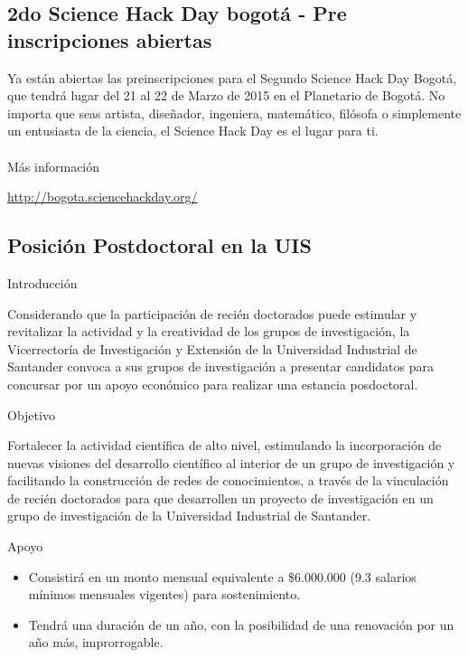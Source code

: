 \documentclass{book}
\begin{document}
\subsection{2do Science Hack Day bogotá - Pre inscripciones abiertas}

Ya están abiertas las preinscripciones para el Segundo Science Hack Day Bogotá, que tendrá lugar del 21 al 22 de Marzo de 2015 en el Planetario de Bogotá. No importa que seas artista, diseñador, ingeniera, matemático, filósofa o simplemente un entusiasta de la ciencia, el Science Hack Day es el lugar para ti.\\
\\
Más información
\begin{center}
\url{http://bogota.sciencehackday.org/}
\end{center}


\subsection{Posición Postdoctoral en la UIS}

\begin{description}
\item[Introducción]
\end{description}

Considerando que la participación de recién doctorados puede estimular y revitalizar la
actividad y la creatividad de los grupos de investigación, la Vicerrectoría de Investigación y
Extensión de la Universidad Industrial de Santander convoca a sus grupos de investigación
a presentar candidatos para concursar por un apoyo económico para realizar una estancia
posdoctoral.
\begin{description}
\item[Objetivo]
\end{description}
Fortalecer la actividad científica de alto nivel, estimulando la incorporación de nuevas visiones
del desarrollo científico al interior de un grupo de investigación y facilitando la construcción
de redes de conocimientos, a través de la vinculación de recién doctorados para
que desarrollen un proyecto de investigación en un grupo de investigación de la Universidad
Industrial de Santander.
\begin{description}
\item[Apoyo]
\end{description}
\begin{itemize}
\item Consistirá en un monto mensual equivalente a \$6.000.000 (9.3 salarios mínimos mensuales
vigentes) para sostenimiento.
\item Tendrá una duración de un año, con la posibilidad de una renovación por un año más,
improrrogable.
\end{itemize}
\end{document}
